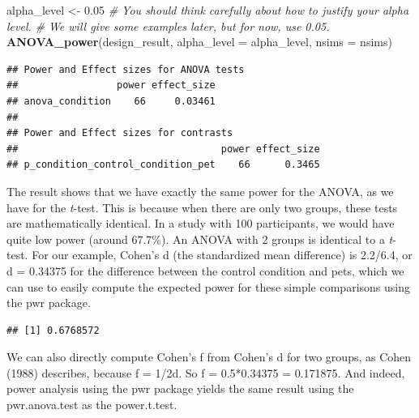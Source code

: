 \documentclass[]{book}
\newenvironment{Shaded}{\begin{snugshade}}{\end{snugshade}}
\newcommand{\CommentTok}[1]{\textcolor[rgb]{0.56,0.35,0.01}{\textit{#1}}}
\newcommand{\DataTypeTok}[1]{\textcolor[rgb]{0.13,0.29,0.53}{#1}}
\newcommand{\DecValTok}[1]{\textcolor[rgb]{0.00,0.00,0.81}{#1}}
\newcommand{\FloatTok}[1]{\textcolor[rgb]{0.00,0.00,0.81}{#1}}
\newcommand{\KeywordTok}[1]{\textcolor[rgb]{0.13,0.29,0.53}{\textbf{#1}}}
\newcommand{\NormalTok}[1]{#1}
\newcommand{\OperatorTok}[1]{\textcolor[rgb]{0.81,0.36,0.00}{\textbf{#1}}}
\newcommand{\StringTok}[1]{\textcolor[rgb]{0.31,0.60,0.02}{#1}}
\begin{document}
\begin{Shaded}
\begin{Highlighting}[]
\NormalTok{alpha_level <-}\StringTok{ }\FloatTok{0.05}
\CommentTok{# You should think carefully about how to justify your alpha level.}
\CommentTok{# We will give some examples later, but for now, use 0.05.}
\KeywordTok{ANOVA_power}\NormalTok{(design_result, }\DataTypeTok{alpha_level =}\NormalTok{ alpha_level, }\DataTypeTok{nsims =}\NormalTok{ nsims)}
\end{Highlighting}
\end{Shaded}

\begin{verbatim}
## Power and Effect sizes for ANOVA tests
##                 power effect_size
## anova_condition    66     0.03461
## 
## Power and Effect sizes for contrasts
##                                   power effect_size
## p_condition_control_condition_pet    66      0.3465
\end{verbatim}

The result shows that we have exactly the same power for the ANOVA, as we have for the \emph{t}-test. This is because when there are only two groups, these tests are mathematically identical. In a study with 100 participants, we would have quite low power (around 67.7\%). An ANOVA with 2 groups is identical to a \emph{t}-test. For our example, Cohen's d (the standardized mean difference) is 2.2/6.4, or d = 0.34375 for the difference between the control condition and pets, which we can use to easily compute the expected power for these simple comparisons using the pwr package.

\begin{Shaded}
\end{Shaded}

\begin{verbatim}
## [1] 0.6768572
\end{verbatim}

We can also directly compute Cohen's f from Cohen's d for two groups, as Cohen (1988) describes, because f = 1/2d. So f = 0.5*0.34375 = 0.171875. And indeed, power analysis using the pwr package yields the same result using the pwr.anova.test as the power.t.test.
\end{document}
